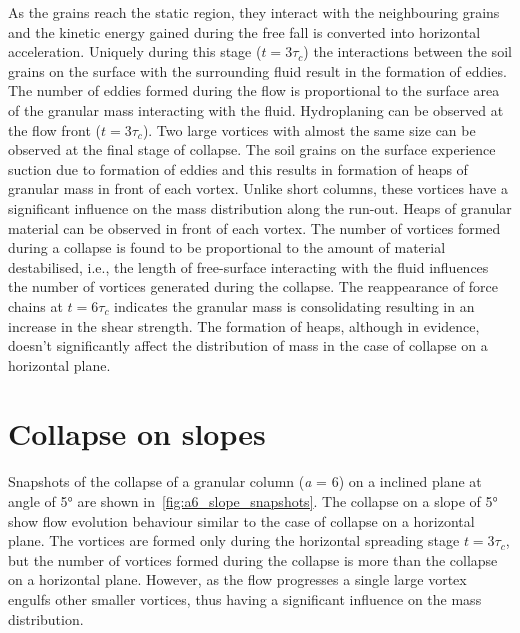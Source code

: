 \documentclass[epj,twocolumn]{webofc}
\begin{document}
As the grains reach the static region, they interact with the neighbouring
grains and the kinetic energy gained during the free fall is converted into
horizontal acceleration. Uniquely during this stage ($t = 3\tau_c$) the
interactions between the soil grains on the surface with the surrounding
fluid result in the formation of eddies. The number of eddies formed during
the flow is proportional to the surface area of the granular mass interacting
with the fluid. Hydroplaning can be observed at the flow front ($t = 3\tau_c$).
Two large vortices with almost the same size can be observed at the final stage of 
collapse. The soil grains on the surface experience suction due to formation of 
eddies and this results in formation of heaps of granular mass in front of each 
vortex. Unlike short columns, these vortices have 
a significant influence on the mass distribution along the run-out. Heaps of 
granular material can be observed in front of each vortex. The number of 
vortices formed during a collapse is found to be proportional to the amount of 
material destabilised, i.e., the length of free-surface interacting with the 
fluid influences the number of vortices generated during the collapse. The 
reappearance of force chains at $t = 6\tau_c$ indicates the 
granular mass is consolidating resulting in an increase in the shear strength. 
The formation of heaps, although in evidence, doesn't significantly 
affect the distribution of mass in the case of collapse on a horizontal plane. 



\section{Collapse on slopes}
Snapshots of the collapse of a granular column (\textit{a} = 6) on a inclined 
plane at angle of 5\si{\degree} are shown in~\cref{fig:a6_slope_snapshots}. 
The collapse on a slope of 5\si{\degree} show flow evolution behaviour similar 
to the case of collapse on a horizontal plane. The vortices are formed only 
during the horizontal spreading stage $t = 3\tau_c$, but the number of vortices 
formed during the collapse is more than the collapse on a horizontal plane. 
However, as the flow progresses a single large vortex engulfs other smaller 
vortices, thus having a significant influence on the mass 
distribution.
\end{document}
